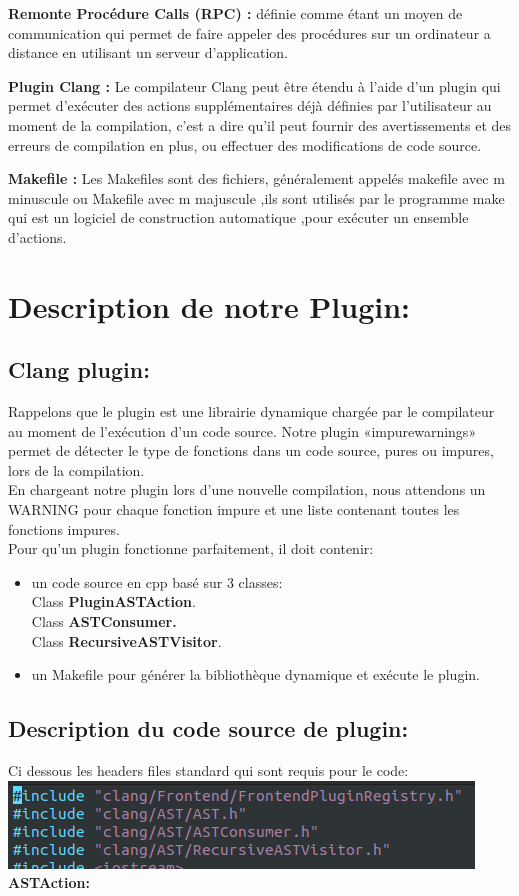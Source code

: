\documentclass[12pt,titlepage]{article}
\begin{document}
\textbf{ Remonte Procédure Calls (RPC) : } définie comme étant un moyen de communication qui permet de faire appeler des procédures sur un ordinateur a distance en utilisant un serveur d'application.\cite{wiki}

\textbf{Plugin Clang :} Le compilateur Clang peut être étendu à l'aide d'un plugin qui permet d'exécuter des actions supplémentaires déjà définies par l'utilisateur au moment de la compilation\cite{ClangTeam}, c'est a dire qu'il peut fournir des avertissements et des erreurs de compilation en plus, ou effectuer des modifications de code source.\cite{clang}

\textbf{Makefile :} Les Makefiles sont des fichiers, généralement appelés makefile avec m minuscule ou Makefile avec m majuscule ,ils sont utilisés par le programme make qui est un logiciel de construction automatique ,pour exécuter un ensemble d'actions.\cite{makefile}
\section{Description de notre Plugin:}
\subsection{Clang plugin:}
Rappelons que le plugin est une librairie dynamique chargée par le compilateur au moment de l’exécution d’un code source.
Notre plugin «impurewarnings»  permet de détecter le type de fonctions dans un code source, pures ou impures, lors de la compilation. \\
En chargeant notre plugin lors d’une nouvelle compilation, nous attendons un WARNING pour chaque fonction impure  et une liste contenant toutes les fonctions impures.\\

Pour qu'un plugin fonctionne parfaitement, il doit contenir: 
\begin{itemize}
    \item un code source en cpp basé sur 3 classes:\\
	 Class \textbf{PluginASTAction}.\\
	 Class  \textbf{ASTConsumer.}\\
	 Class \textbf{RecursiveASTVisitor}.
\item un Makefile  pour générer la bibliothèque dynamique et exécute le plugin.
\end{itemize}
\subsection{Description du code source de plugin:} 
Ci dessous les headers files standard qui sont requis pour le code: \\
\includegraphics[scale=0.8]{Bibliotheques.png}
\\
\textbf{ASTAction:}
\end{document}
